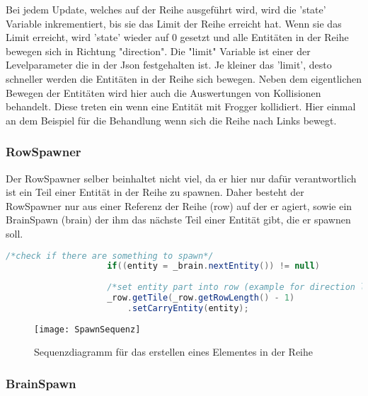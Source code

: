 \documentclass[a4paper,10pt]{report}
\begin{document}
{{{				\noindent
				Bei jedem Update, welches auf der Reihe ausgeführt wird, wird die 'state' Variable inkrementiert, bis sie das Limit der Reihe erreicht hat.
				Wenn sie das Limit erreicht, wird 'state' wieder auf 0 gesetzt und alle Entitäten in der Reihe bewegen sich in Richtung "direction".
				Die "limit" Variable ist einer der Levelparameter die in der Json festgehalten ist. Je kleiner das 'limit', desto schneller werden
				die Entitäten in der Reihe sich bewegen.			
				\newline \newline  
				Neben dem eigentlichen Bewegen der Entitäten wird hier auch die Auswertungen von Kollisionen behandelt. 
				Diese treten ein wenn eine Entität mit Frogger kollidiert. Hier einmal an dem Beispiel für die Behandlung wenn sich
				die Reihe nach Links bewegt.
								
				
				
			}		
			\newpage 
			\subsubsection{RowSpawner}
			{
				\label{sssec:rowspawnerclass}
				Der RowSpawner selber beinhaltet nicht viel, da er hier nur dafür verantwortlich ist ein Teil einer Entität in der Reihe zu spawnen.
				Daher besteht der RowSpawner nur aus einer Referenz der Reihe (row) auf der er agiert, sowie ein BrainSpawn (brain) der ihm das nächste Teil einer Entität gibt, die er spawnen soll.					
				
				\begin{lstlisting}[language=Java, caption=RowSpawner - Snippet Update Method]
					/*check if there are something to spawn*/
					if((entity = _brain.nextEntity()) != null)
					
					/*set entity part into row (example for direction left)*/
					_row.getTile(_row.getRowLength() - 1)
						.setCarryEntity(entity);
				\end{lstlisting}							
								
				\begin{figure}			
					\texttt{[image: SpawnSequenz]}
					\caption{Sequenzdiagramm für das erstellen eines Elementes in der Reihe}
					\label{fig:brainspawn}
				\end{figure}								
			}	
			\newpage 
			\subsubsection{BrainSpawn}
			{
				\label{sssec:brainspawnclass}
				
}}}
\end{document}
